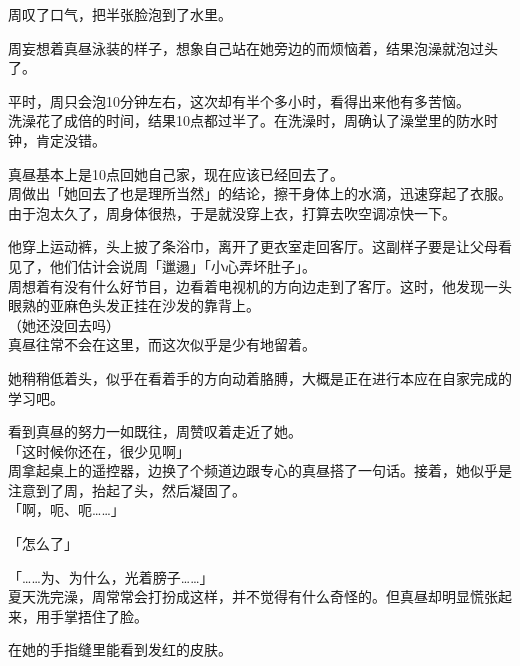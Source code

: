 周叹了口气，把半张脸泡到了水里。\\

\vspace{2\baselineskip}

周妄想着真昼泳装的样子，想象自己站在她旁边的而烦恼着，结果泡澡就泡过头了。

平时，周只会泡10分钟左右，这次却有半个多小时，看得出来他有多苦恼。\\

洗澡花了成倍的时间，结果10点都过半了。在洗澡时，周确认了澡堂里的防水时钟，肯定没错。

真昼基本上是10点回她自己家，现在应该已经回去了。\\

周做出「她回去了也是理所当然」的结论，擦干身体上的水滴，迅速穿起了衣服。\\

由于泡太久了，周身体很热，于是就没穿上衣，打算去吹空调凉快一下。

他穿上运动裤，头上披了条浴巾，离开了更衣室走回客厅。这副样子要是让父母看见了，他们估计会说周「邋遢」「小心弄坏肚子」。\\

周想着有没有什么好节目，边看着电视机的方向边走到了客厅。这时，他发现一头眼熟的亚麻色头发正挂在沙发的靠背上。\\

（她还没回去吗）\\

真昼往常不会在这里，而这次似乎是少有地留着。

她稍稍低着头，似乎在看着手的方向动着胳膊，大概是正在进行本应在自家完成的学习吧。

看到真昼的努力一如既往，周赞叹着走近了她。\\

「这时候你还在，很少见啊」\\

周拿起桌上的遥控器，边换了个频道边跟专心的真昼搭了一句话。接着，她似乎是注意到了周，抬起了头，然后凝固了。\\

「啊，呃、呃……」

「怎么了」

「……为、为什么，光着膀子……」\\

夏天洗完澡，周常常会打扮成这样，并不觉得有什么奇怪的。但真昼却明显慌张起来，用手掌捂住了脸。

在她的手指缝里能看到发红的皮肤。\\

